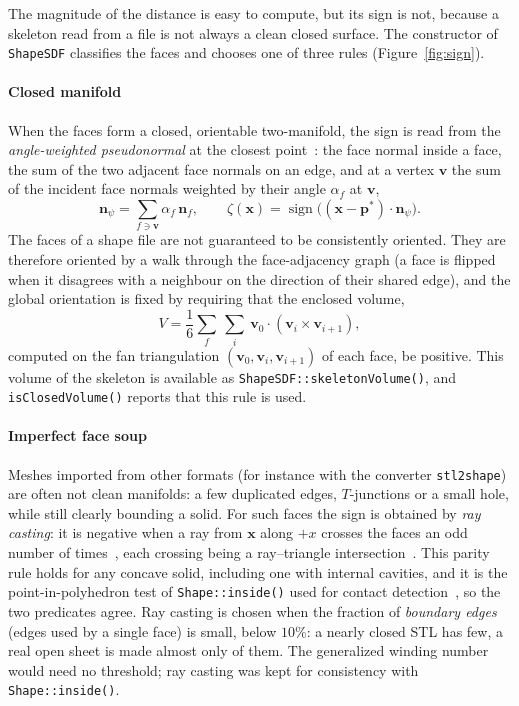 \documentclass[11pt,a4paper]{article}
\newcommand{\vect}[1]{\mathbf{#1}}
\newcommand{\sgnsdf}{\zeta}
\newcommand{\code}[1]{\texttt{#1}}
\begin{document}
The magnitude of the distance is easy to compute, but its sign is not, because a
skeleton read from a file is not always a clean closed surface. The constructor of
\code{ShapeSDF} classifies the faces and chooses one of three rules
(Figure~\ref{fig:sign}).

\paragraph{Closed manifold} When the faces form a closed, orientable two-manifold,
the sign is read from the \emph{angle-weighted pseudonormal} at the closest
point~\cite{baerentzen2005}: the face normal inside a face, the sum of the two
adjacent face normals on an edge, and at a vertex $\vect{v}$ the sum of the
incident face normals weighted by their angle $\alpha_f$ at $\vect{v}$,
%
\begin{equation}
  \vect{n}_\psi = \sum_{f\ni\vect{v}}\alpha_f\,\vect{n}_f,
  \qquad
  \sgnsdf(\vect{x}) = \operatorname{sign}\!\big((\vect{x}-\vect{p}^\ast)\cdot\vect{n}_\psi\big).
  \label{eq:pseudonormal}
\end{equation}
%
The faces of a shape file are not guaranteed to be consistently oriented. They are
therefore oriented by a walk through the face-adjacency graph (a face is flipped
when it disagrees with a neighbour on the direction of their shared edge), and the
global orientation is fixed by requiring that the enclosed volume,
%
\begin{equation}
  V = \frac{1}{6}\sum_{f}\ \sum_{i}\ \vect{v}_0\cdot(\vect{v}_i\times\vect{v}_{i+1}),
  \label{eq:signedvol}
\end{equation}
%
computed on the fan triangulation $(\vect{v}_0,\vect{v}_i,\vect{v}_{i+1})$ of each
face, be positive. This volume of the skeleton is available as
\code{ShapeSDF::skeletonVolume()}, and \code{isClosedVolume()} reports that this
rule is used.

\paragraph{Imperfect face soup} Meshes imported from other formats (for instance
with the converter \code{stl2shape}) are often not clean manifolds: a few
duplicated edges, $T$-junctions or a small hole, while still clearly bounding a
solid. For such faces the sign is obtained by \emph{ray casting}: it is negative
when a ray from $\vect{x}$ along $+x$ crosses the faces an odd number of
times~\cite{orourke1998}, each crossing being a ray--triangle
intersection~\cite{moller1997}. This parity rule holds for any concave solid,
including one with internal cavities, and it is the point-in-polyhedron test of
\code{Shape::inside()} used for contact detection~\cite{richefeu2025rockable}, so
the two predicates agree. Ray casting is chosen when the fraction of
\emph{boundary edges} (edges used by a single face) is small, below $10\%$: a
nearly closed STL has few, a real open sheet is made almost only of them. The
generalized winding number~\cite{jacobson2013} would need no threshold; ray casting
was kept for consistency with \code{Shape::inside()}.
\end{document}
